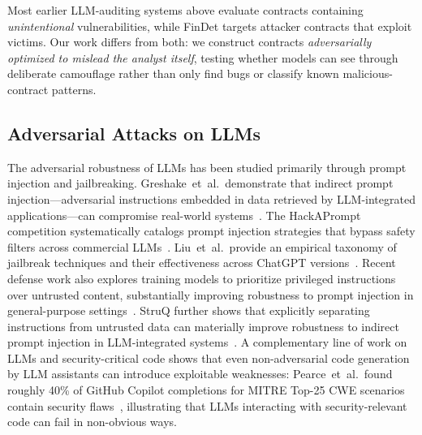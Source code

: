 \documentclass[sigconf]{acmart}
\begin{document}
Most earlier LLM-auditing systems above evaluate contracts containing
\emph{unintentional} vulnerabilities, while FinDet targets attacker
contracts that exploit victims. Our work differs from both: we construct
contracts \emph{adversarially optimized to mislead the analyst itself},
testing whether models can see through deliberate camouflage rather than
only find bugs or classify known malicious-contract patterns.

\subsection{Adversarial Attacks on LLMs}\label{sec:related:adversarial}

The adversarial robustness of LLMs has been studied primarily through
prompt injection and jailbreaking. Greshake~et~al.\ demonstrate that
indirect prompt injection---adversarial instructions embedded in data
retrieved by LLM-integrated applications---can compromise real-world
systems~\cite{greshake2023inject}. The HackAPrompt competition
systematically catalogs prompt injection strategies that bypass safety
filters across commercial LLMs~\cite{schulhoff2023hackaprompt}.
Liu~et~al.\ provide an empirical taxonomy of jailbreak techniques and
their effectiveness across {ChatGPT} versions~\cite{liu2023jailbreaking}.
Recent defense work also explores training models to prioritize privileged
instructions over untrusted content, substantially improving robustness to
prompt injection in general-purpose settings~\cite{wallace2024instructionhierarchy}.
StruQ further shows that explicitly separating instructions from untrusted
data can materially improve robustness to indirect prompt injection in
LLM-integrated systems~\cite{chen2025struq}. A complementary line of work
on LLMs and security-critical code shows that even
non-adversarial code generation by LLM assistants can introduce
exploitable weaknesses: Pearce~et~al.\ found roughly 40\% of GitHub
Copilot completions for MITRE Top-25 CWE scenarios contain security
flaws~\cite{pearce2022copilot}, illustrating that LLMs interacting with
security-relevant code can fail in non-obvious ways.
\end{document}
